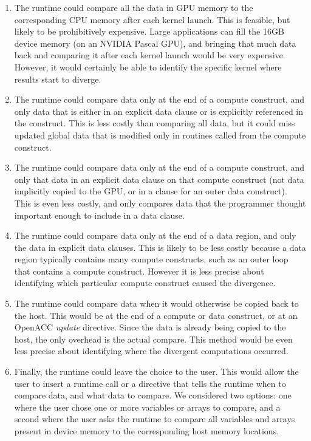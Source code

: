 \begin{enumerate}
\item The runtime could compare all the data in GPU memory to the corresponding CPU memory after each kernel launch.
This is feasible, but likely to be prohibitively expensive.
Large applications can fill the 16GB device memory (on an NVIDIA Pascal GPU), and bringing that much data back and comparing it after each kernel launch would be very expensive.
However, it would certainly be able to identify the specific kernel where results start to diverge.

\item The runtime could compare data only at the end of a compute construct, and only data that is either in an explicit data clause or is explicitly referenced in the construct.
This is less costly than comparing all data, but it could miss updated global data that is modified only in routines called from the compute construct.

\item The runtime could compare data only at the end of a compute construct, and only that data in an explicit data clause on that compute construct (not data implicitly copied to the GPU, or in a clause for an outer data construct).
This is even less costly, and only compares data that the programmer thought important enough to include in a data clause.

\item The runtime could compare data only at the end of a data region, and only the data in explicit data clauses.
This is likely to be less costly because a data region typically contains many compute constructs, such as an outer loop that contains a compute construct.
However it is less precise about identifying which particular compute construct caused the divergence.

\item The runtime could compare data when it would otherwise be copied back to the host.
This would be at the end of a compute or data construct, or at an OpenACC \emph{update} directive.
Since the data is already being copied to the host, the only overhead is the actual compare.
This method would be even less precise about identifying where the divergent computations occurred.

\item Finally, the runtime could leave the choice to the user.
This would allow the user to insert a runtime call or a directive that tells the runtime when to compare data, and what data to compare.
We considered two options: one where the user chose one or more variables or arrays to compare, and a second where the user asks the runtime to compare all variables and arrays present in device memory to the corresponding host memory locations.
\end{enumerate}

